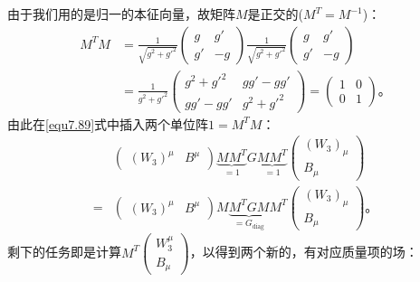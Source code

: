 由于我们用的是归一的本征向量，故矩阵$M$是正交的($M^T = M^{-1}$)：
\begin{equation}
\label{equ7.92}
\begin{aligned}
M^TM & = \frac{1}{\sqrt{g^2+g'^2}} \begin{pmatrix}
g & g'\\ g'&-g
\end{pmatrix} \frac{1}{\sqrt{g^2+g'^2}} \begin{pmatrix}
g & g'\\ g'&-g
\end{pmatrix} \\
& = \frac{1}{g^2+g'^2} \begin{pmatrix}
g^2+g'^2 & gg'-gg'\\ gg'-gg'&g^2+g'^2
\end{pmatrix} = \begin{pmatrix}
1 & 0\\ 0 & 1
\end{pmatrix}\text{。}
\end{aligned}
\end{equation}
由此在\ref{equ7.89}式中插入两个单位阵$1 = M^TM$：
\begin{equation}
\label{equ7.93}
\begin{aligned}
&\begin{pmatrix}
(W_3)^\mu & B^\mu
\end{pmatrix} \underbrace{MM^T}_{=1} G \underbrace{MM^T}_{=1} \begin{pmatrix}
(W_3)_\mu \\ B_\mu
\end{pmatrix} \\ =& \begin{pmatrix}
(W_3)^\mu & B^\mu
\end{pmatrix} M\underbrace{M^TGM}_{=G_\text{diag}}M^T \begin{pmatrix}
(W_3)_\mu \\ B_\mu
\end{pmatrix} \text{。}
\end{aligned}
\end{equation}
剩下的任务即是计算$M^T \begin{pmatrix}
W_3^\mu \\ B_\mu
\end{pmatrix}$，以得到两个新的，有对应质量项的场：
